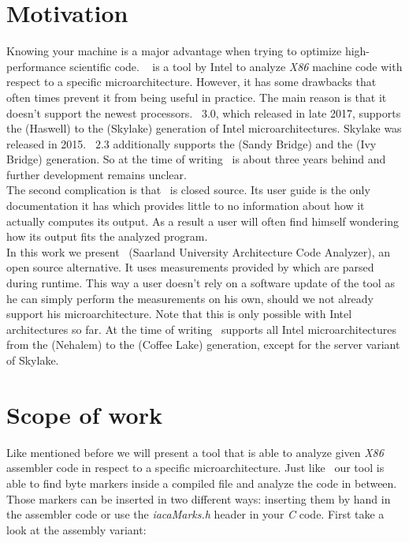 
\section{Motivation}

Knowing your machine is a major advantage when trying to optimize high-performance scientific code. \iaca\ \cite{iaca} is a tool by Intel to analyze \emph{X86} machine code with respect to a specific microarchitecture. However, it has some drawbacks that often times prevent it from being useful in practice. The main reason is that it doesn't support the newest processors. \iaca\ $3.0$, which released in late 2017, supports the  (Haswell) to the  (Skylake) generation of Intel microarchitectures. Skylake was released in 2015. \iaca\ $2.3$ additionally supports the  (Sandy Bridge) and the  (Ivy Bridge) generation. So at the time of writing \iaca\ is about three years behind and further development remains unclear.\\
The second complication is that \iaca\ is closed source. Its user guide \cite{userguide} is the only documentation it has which provides little to no information about how it actually computes its output. As a result a user will often find himself wondering how its output fits the analyzed program.\\
In this work we present \suaca\ (Saarland University Architecture Code Analyzer), an open source alternative. It uses measurements provided by \cite{Andreas} which are parsed during runtime. This way a user doesn't rely on a software update of the tool as he can simply perform the measurements on his own, should we not already support his microarchitecture. Note that this is only possible with Intel architectures so far. At the time of writing \suaca\ supports all Intel microarchitectures from the  (Nehalem) to the  (Coffee Lake) generation, except for the server variant of Skylake.

\newpage
\section{Scope of work}

Like mentioned before we will present a tool that is able to analyze given \emph{X86} assembler code in respect to a specific microarchitecture. Just like \iaca\ our tool is able to find byte markers inside a compiled file and analyze the code in between. Those markers can be inserted in two different ways: inserting them by hand in the assembler code or use the \emph{iacaMarks.h} header in your \emph{C} code. First take a look at the assembly variant:

